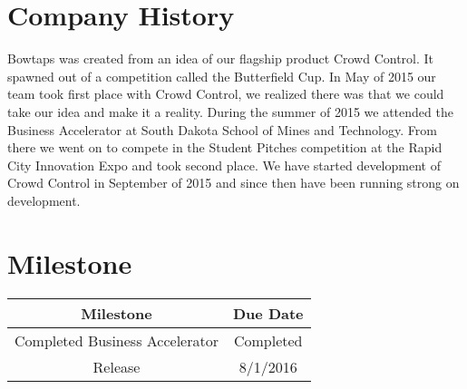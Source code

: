 \section{Company History}

Bowtaps was created from an idea of our flagship product Crowd Control.  It spawned out of a competition called the Butterfield Cup.  In May of 2015 our team took first place with Crowd Control, we realized there was that we could take our idea and make it a reality.  During the summer of 2015 we attended the Business Accelerator at South Dakota School of Mines and Technology.  From there we went on to compete in the Student Pitches competition at the Rapid City Innovation Expo and took second place.  We have started development of Crowd Control in September of 2015 and since then have been running strong on development.

\section{Milestone}
\begin{center}
\begin{tabular}{|c | c|}
\hline
Milestone & Due Date\\
\hline
Completed Business Accelerator & Completed \\
\hline
Release & 8/1/2016\\
\hline
\end{tabular}
\end{center}








